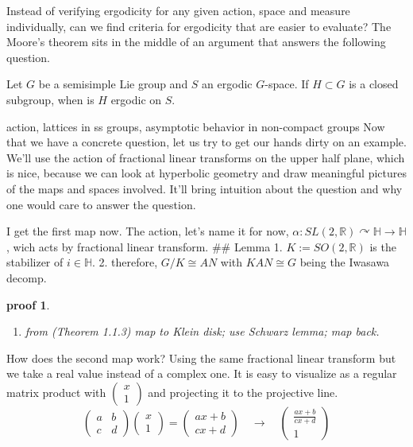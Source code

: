 \documentclass[
  12pt
]{article}
\providecommand{\tightlist}{%
  \setlength{\itemsep}{0pt}\setlength{\parskip}{0pt}}
\theoremstyle{break}
\theoremstyle{plain}
\newtheorem*{pf}{proof}
\begin{document}
  Instead of verifying ergodicity for any given action, space and measure
  individually, can we find criteria for ergodicity that are easier to
  evaluate? The Moore's theorem sits in the middle of an argument that
  answers the following question.

  Let $G$ be a semisimple Lie group and $S$ an ergodic $G$-space. If
  $H\subset G$ is a closed subgroup, when is $H$ ergodic on $S$.


  action, lattices in ss groups, asymptotic behavior in non-compact groups
  \cite{howe79}
  Now that we have a concrete question, let us try to get our hands dirty
  on an example. We'll use the action of fractional linear transforms on
  the upper half plane, which is nice, because we can look at hyperbolic
  geometry and draw meaningful pictures of the maps and spaces involved.
  It'll bring intuition about the question and why one would care to
  answer the question.

  I get the first map now. The action, let's name it for now,
  $\alpha : SL(2, \mathbb{R}) \curvearrowright \mathbb{H} \rightarrow \mathbb{H}$,
  wich acts by fractional linear transform. \#\# Lemma 1.
  $K:= SO(2, \mathbb{R})$ is the stabilizer of $i \in \mathbb{H}$. 2.
  therefore, $G/K \cong AN$ with $KAN \cong G$ being the Iwasawa
  decomp.

  \begin{pf}\label{pf:miyake}
  \begin{enumerate}
  \def\labelenumi{\arabic{enumi}.}
  \tightlist
  \item
    from \cite{Miyake89}(Theorem 1.1.3) map to Klein disk; use Schwarz
    lemma; map back.
  \end{enumerate}
  \end{pf}

  How does the second map work? Using the same fractional linear transform
  but we take a real value instead of a complex one. It is easy to
  visualize as a regular matrix product with
  $\begin{pmatrix}x \\ 1\end{pmatrix}$ and projecting it to the
  projective line. \[
  \begin{pmatrix}a & b \\ c & d\end{pmatrix}\begin{pmatrix}x \\ 1\end{pmatrix} =
  \begin{pmatrix}ax + b \\ cx + d\end{pmatrix} \quad \rightarrow \quad
  \begin{pmatrix}\frac{ax + b}{cx + d} \\ 1\end{pmatrix}
  \] 
\end{document}
